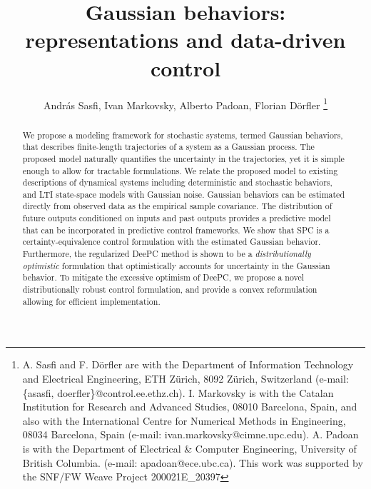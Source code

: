 \documentclass[letterpaper, 10 pt, conference]{ieeeconf}
\title{\LARGE \bf
Gaussian behaviors: representations and data-driven control
}
\author{Andr\'as Sasfi, Ivan Markovsky, Alberto Padoan, Florian D\"orfler%
\thanks{A. Sasfi and F. D\"orfler are with the Department of Information Technology and
Electrical Engineering, ETH Z\"urich, 8092 Z\"urich, Switzerland (e-mail: \{asasfi, doerfler\}@control.ee.ethz.ch). I. Markovsky is with the Catalan Institution for Research and Advanced Studies, 08010 Barcelona, Spain, and also with the International Centre for Numerical Methods in Engineering, 08034 Barcelona, Spain (e-mail: ivan.markovsky@cimne.upc.edu). A. Padoan is with the Department of Electrical \& Computer Engineering, University of British Columbia. (e-mail: apadoan@ece.ubc.ca). This work was supported by the SNF/FW Weave Project 200021E\_20397}
}
\begin{document}
\maketitle
\thispagestyle{empty}
\pagestyle{empty}


\begin{abstract}
We propose a modeling framework for stochastic systems, termed Gaussian behaviors, 
that describes finite-length trajectories of a system as a Gaussian process.
The proposed model naturally quantifies the uncertainty in the trajectories, yet it is simple enough to allow for tractable formulations.
We relate the proposed model to existing descriptions of dynamical systems including deterministic and stochastic behaviors, and \acrlong{LTI} state-space models with Gaussian noise.
Gaussian behaviors can be estimated directly from observed data as the empirical sample covariance.
The distribution of future outputs conditioned on inputs and past outputs provides a predictive model that can be incorporated in predictive control frameworks.
We show that \acrlong{SPC} is a certainty-equivalence control formulation with the estimated Gaussian behavior.
Furthermore, the regularized \gls{DeePC} method is shown to be a {\textit{distributionally optimistic}} formulation that optimistically accounts for uncertainty in the Gaussian behavior.
To mitigate the excessive optimism of \gls{DeePC}, we propose a novel distributionally robust control formulation, and provide a convex reformulation allowing for efficient implementation.
\end{abstract}
\end{document}
